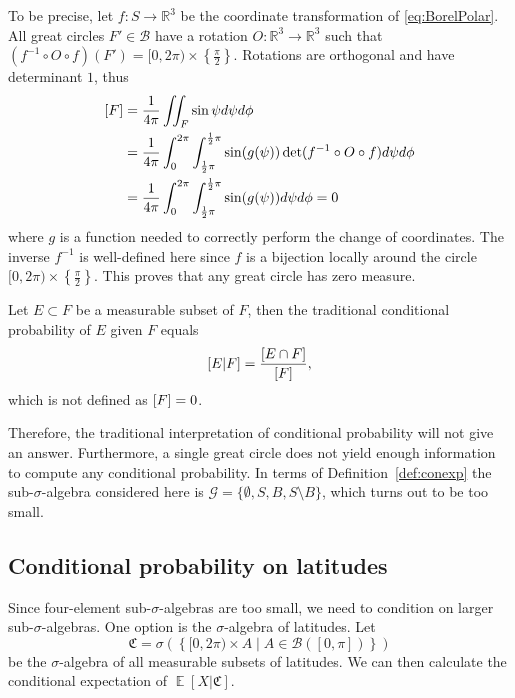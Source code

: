 \documentclass[a4paper]{report}
\theoremstyle{plain}
\theoremstyle{definition}
\theoremstyle{remark}
\numberwithin{equation}{chapter}
\newcommand{\R}{\mathbb{R}}
\let\P\relax
\DeclareMathOperator{\P}{\mathbb{P}}
\DeclareMathOperator{\E}{\mathbb{E}}
\DeclareMathOperator{\1}{\mathbbm{1}}
\renewcommand{\G}{\mathcal{G}}
\newcommand{\B}{\mathcal{B}}
\begin{document}
To be precise, let $f\colon S\to\R^3$ be the coordinate transformation of \eqref{eq:BorelPolar}. All great circles $F'\in\B$ have a rotation $O\colon\R^3\to\R^3$ such that $(f^{-1}\circ O\circ f)(F')=[0,2\pi)\times\left\{\frac{\pi}{2}\right\}$. Rotations are orthogonal and have determinant $1$, thus
\begin{align}
\P[F]&=\frac{1}{4\pi}\iint_F\sin\psi d\psi d\phi\\
&=\frac{1}{4\pi}\int_0^{2\pi}\int_{\frac{1}{2}\pi}^{\frac{1}{2}\pi}\sin(g(\psi)) \det(f^{-1}\circ O\circ f)d\psi d\phi\\
&=\frac{1}{4\pi}\int_0^{2\pi}\int_{\frac{1}{2}\pi}^{\frac{1}{2}\pi}\sin(g(\psi)) d\psi d\phi=0
\end{align}
where $g$ is a function needed to correctly perform the change of coordinates.
The inverse $f^{-1}$ is well-defined here since $f$ is a bijection locally around the circle $[0,2\pi)\times\left\{\frac{\pi}{2}\right\}$. This proves that any great circle has zero measure.

Let $E\subset F$ be a measurable subset of $F$, then the traditional conditional probability of $E$ given $F$ equals
\begin{equation}
\P[E|F]=\frac{\P[E\cap F]}{\P[F]},
\end{equation}
which is not defined as $\P[F]=0$.

Therefore, the traditional interpretation of conditional probability will not give an answer. Furthermore, a single great circle does not yield enough information to compute any conditional probability. In terms of Definition~\ref{def:conexp} the sub-$\sigma$-algebra considered here is $\G=\{\emptyset,S,B,S\setminus B\}$, which turns out to be too small.

\subsection{Conditional probability on latitudes}\label{sec:BorelLong}
Since four-element sub-$\sigma$-algebras are too small, we need to condition on larger sub-$\sigma$-algebras. One option is the $\sigma$-algebra of latitudes. Let
\begin{equation}
\mathfrak{C}=\sigma\left(\left\{[0,2\pi)\times A\mid A\in\B([0,\pi])\right\}\right)
\end{equation}
be the $\sigma$-algebra of all measurable subsets of latitudes. We can then calculate the conditional expectation of $\E[X|\mathfrak{C}]$.
\end{document}
